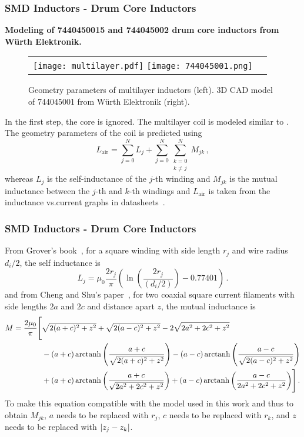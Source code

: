 \begin{frame}
	\frametitle{SMD Inductors - Drum Core Inductors}
	\textbf{Modeling of 7440450015 and 744045002 drum core inductors from Würth Elektronik.}\\
	\begin{figure}
		\centering
		\begin{tabular}{cc}
			\texttt{[image: multilayer.pdf]}
			\hspace{25pt}
			\texttt{[image: 744045001.png]}&
		\end{tabular}
		\caption{Geometry parameters of multilayer inductors (left). 3D CAD model of 744045001 from Würth Elektronik (right).}
	\end{figure}
	\vspace{-25pt}
	In the first step, the core is ignored. The multilayer coil is modeled similar to \cite{6732932}. The geometry parameters of the coil is predicted using
	\begin{equation}
		L_\mathrm{air} = \sum_{j=0}^{N}L_j + \sum_{j=0}^{N}\sum_{\substack{k=0 \\ k\neq j}}^{N}M_{jk}\,,
	\end{equation}
	whereas $L_j$ is the self-inductance of the $j$-th winding and $M_{jk}$ is the mutual inductance between the $j$-th and $k$-th windings and $L_\mathrm{air}$ is taken from the inductance vs.current graphs in datasheets~\cite{6732932}.
\end{frame}

\begin{frame}
	\frametitle{SMD Inductors - Drum Core Inductors}
	From Grover's book~\cite{grover2013}, for a square winding with side length $r_j$ and wire radius $d_i/2$, the self inductance is
	\begin{equation}  \label{eqn:multilayer_eqn2}
		L_j = \mu_0\frac{2r_j}{\pi}\left(\ln\left(\frac{2r_j}{(d_i/2)}\right) - 0.77401\right)\,.
	\end{equation}
	and from Cheng and Shu's paper~\cite{cheng}, for two coaxial square current filaments with side lengths $2a$ and $2c$ and distance apart $z$, the mutual inductance is
	\begin{equation}
		\begin{aligned}
		    M = \frac{2\mu_0}{\pi}\Bigg[&
		    \sqrt{2(a+c)^2+z^2}+\sqrt{2(a-c)^2+z^2}-2\sqrt{2a^2+2c^2+z^2} \\ &-(a+c)\operatorname{arctanh}{\left(\frac{a+c}{\sqrt{2(a+c)^2+z^2}}\right)}-(a-c)\operatorname{arctanh}{\left(\frac{a-c}{\sqrt{2(a-c)^2+z^2}}\right)} \\
		    &+(a+c)\operatorname{arctanh}{\left(\frac{a+c}{\sqrt{2a^2+2c^2+z^2}}\right)}+(a-c)\operatorname{arctanh}{\left(\frac{a-c}{2a^2+2c^2+z^2}\right)}\Bigg]\,.
		\end{aligned}
	\end{equation}
	To make this equation compatible with the model used in this work and thus to obtain $M_{jk}$, $a$ needs to be replaced with $r_j$, $c$ needs to be replaced with $r_k$, and $z$ needs to be replaced with $\lvert z_j - z_k\rvert$.
\end{frame}
	
